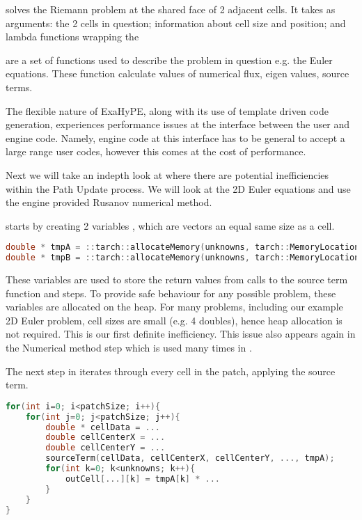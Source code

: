  solves the Riemann problem at the shared face of 2 adjacent cells.
It takes as arguments: the 2 cells in question; information about cell size and position; and lambda functions wrapping the 

 are a set of functions used to describe the problem in question e.g. the Euler equations.
These function calculate values of numerical flux, eigen values, source terms.

The flexible nature of ExaHyPE, along with its use of template driven code generation, experiences performance issues at the interface between the user and engine code.
Namely, engine code at this interface has to be general to accept a large range user codes, however this comes at the cost of performance.


Next we will take an indepth look at where there are potential inefficiencies within the Path Update process.
We will look at the 2D Euler equations and use the engine provided Rusanov numerical method.


 starts by creating 2 variables ,  which are vectors an equal same size as a cell.

\begin{lstlisting}[language=c]
double * tmpA = ::tarch::allocateMemory(unknowns, tarch::MemoryLocation::Heap);
double * tmpB = ::tarch::allocateMemory(unknowns, tarch::MemoryLocation::Heap);
\end{lstlisting}

These variables are used to store the return values from calls to the source term function and  steps.
To provide safe behaviour for any possible problem, these variables are allocated on the heap.
For many problems, including our example 2D Euler problem, cell sizes are small (e.g. 4 doubles), hence heap allocation is not required. 
This is our first definite inefficiency.
This issue also appears again in the Numerical method step which is used many times in .

The next step in  iterates through every cell in the patch, applying the source term.
\begin{lstlisting}[language=c]
for(int i=0; i<patchSize; i++){
    for(int j=0; j<patchSize; j++){
        double * cellData = ...
        double cellCenterX = ...
        double cellCenterY = ...    
        sourceTerm(cellData, cellCenterX, cellCenterY, ..., tmpA);
        for(int k=0; k<unknowns; k++){
            outCell[...][k] = tmpA[k] * ...
        }
    }
}
\end{lstlisting}


